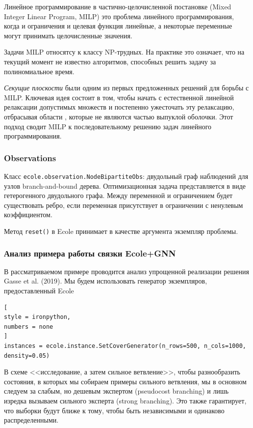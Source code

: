 \documentclass[%
	11pt,
	a4paper,
	utf8,
		]{article}
\begin{document}
Линейное программирование в частично-целочисленной постановке (Mixed Integer Linear Program, MILP) это проблема линейного программирования, когда и ограничения и целевая функция линейные, а некоторые переменные могут принимать целочисленные значения.

Задачи MILP относятсу к классу NP-трудных. На практике это означает, что на текущий момент не известно алгоритмов, способных решить задачу за полиномиальное время.

\emph{Секущие плоскости} были одним из первых предложенных решений для борьбы с MILP. Ключевая идея состоит в том, чтобы начать с естественной  линейной релаксации допустимых множеств и постепенно ужесточать эту релаксацию, отбрасывая области , которые не являются частью выпуклой оболочки. Этот подход сводит MILP к последовательному решению задач линейного программирования.



\subsubsection{Observations}

Класс \texttt{ecole.observation.NodeBipartiteObs}: двудольный граф наблюдений для узлов branch-and-bound дерева. Оптимизационная задача представляется в виде гетерогенного двудольного графа. Между переменной и ограничением будет существовать ребро, если переменная присутствует в ограничении с ненулевым коэффициентом.

Метод \texttt{reset()} в Ecole принимает в качестве аргумента экземпляр проблемы. 

\subsubsection{Анализ примера работы связки Ecole+GNN}

В рассматриваемом примере проводится анализ упрощенной реализации решения Gasse et al. (2019). Мы будем использовать генератор экземпляров, предоставленный Ecole
\begin{lstlisting}[
style = ironpython,
numbers = none
]
instances = ecole.instance.SetCoverGenerator(n_rows=500, n_cols=1000, density=0.05)
\end{lstlisting}

В схеме <<исследование, а затем сильное ветвление>>, чтобы разнообразить состояния, в которых мы собираем примеры сильного ветвления, мы в основном следуем за слабым, но дешевым экспертом (pseudocost branching) и лишь изредка вызываем сильного эксперта (strong branching). Это также гарантирует, что выборки будут ближе к тому, чтобы быть независимыми и одинаково распределенными.
\end{document}
